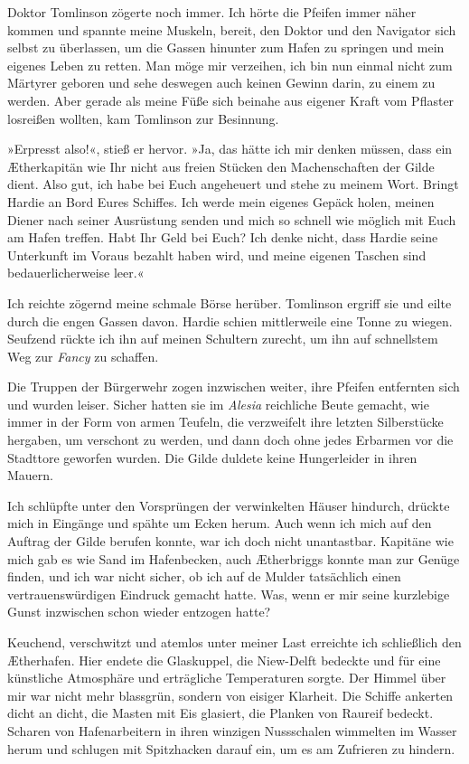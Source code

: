 Doktor Tomlinson zögerte noch immer. Ich hörte die Pfeifen immer
näher kommen und spannte meine Muskeln, bereit, den Doktor und den
Navigator sich selbst zu überlassen, um die Gassen hinunter zum
Hafen zu springen und mein eigenes Leben zu retten. Man möge mir
verzeihen, ich bin nun einmal nicht zum Märtyrer geboren und sehe
deswegen auch keinen Gewinn darin, zu einem zu werden. Aber gerade
als meine Füße sich beinahe aus eigener Kraft vom Pflaster
losreißen wollten, kam Tomlinson zur Besinnung.

»Erpresst also!«, stieß er hervor. »Ja, das hätte ich mir denken
müssen, dass ein Ætherkapitän wie Ihr nicht aus freien Stücken den
Machenschaften der Gilde dient. Also gut, ich habe bei Euch
angeheuert und stehe zu meinem Wort. Bringt Hardie an Bord Eures
Schiffes. Ich werde mein eigenes Gepäck holen, meinen Diener nach
seiner Ausrüstung senden und mich so schnell wie möglich mit Euch
am Hafen treffen. Habt Ihr Geld bei Euch? Ich denke nicht, dass
Hardie seine Unterkunft im Voraus bezahlt haben wird, und meine
eigenen Taschen sind bedauerlicherweise leer.«

Ich reichte zögernd meine schmale Börse herüber. Tomlinson ergriff
sie und eilte durch die engen Gassen davon. Hardie schien
mittlerweile eine Tonne zu wiegen. Seufzend rückte ich ihn auf
meinen Schultern zurecht, um ihn auf schnellstem Weg zur
\emph{Fancy} zu schaffen.

Die Truppen der Bürgerwehr zogen inzwischen weiter, ihre Pfeifen
entfernten sich und wurden leiser. Sicher hatten sie im
\emph{Alesia} reichliche Beute gemacht, wie immer in der Form von
armen Teufeln, die verzweifelt ihre letzten Silberstücke hergaben,
um verschont zu werden, und dann doch ohne jedes Erbarmen vor die
Stadttore geworfen wurden. Die Gilde duldete keine Hungerleider in
ihren Mauern.

\bigpar

Ich schlüpfte unter den Vorsprüngen der verwinkelten Häuser
hindurch, drückte mich in Eingänge und spähte um Ecken herum. Auch
wenn ich mich auf den Auftrag der Gilde berufen konnte, war ich
doch nicht unantastbar. Kapitäne wie mich gab es wie Sand im
Hafenbecken, auch Ætherbriggs konnte man zur Genüge finden, und ich
war nicht sicher, ob ich auf de Mulder tatsächlich einen
vertrauenswürdigen Eindruck gemacht hatte. Was, wenn er mir seine
kurzlebige Gunst inzwischen schon wieder entzogen hatte?

Keuchend, verschwitzt und atemlos unter meiner Last erreichte ich
schließlich den Ætherhafen. Hier endete die Glaskuppel, die
Niew-Delft bedeckte und für eine künstliche Atmosphäre und
erträgliche Temperaturen sorgte. Der Himmel über mir war nicht mehr
blassgrün, sondern von eisiger Klarheit. Die Schiffe ankerten dicht
an dicht, die Masten mit Eis glasiert, die Planken von Raureif
bedeckt. Scharen von Hafenarbeitern in ihren winzigen Nussschalen
wimmelten im Wasser herum und schlugen mit Spitzhacken darauf ein,
um es am Zufrieren zu hindern.

